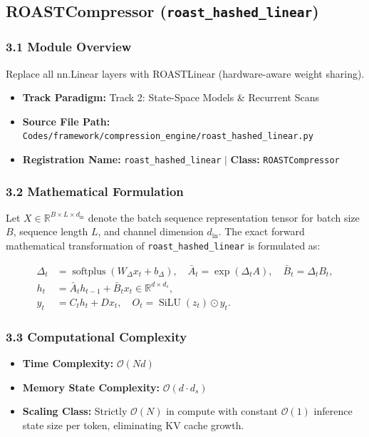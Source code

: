 \subsection{ROASTCompressor (\texttt{roast\_hashed\_linear})}
\label{sec:app_module_roast\_hashed\_linear}

\subsubsection*{3.1 Module Overview}
Replace all nn.Linear layers with ROASTLinear (hardware-aware weight sharing).
\begin{itemize}
    \item \textbf{Track Paradigm:} Track 2: State-Space Models & Recurrent Scans
    \item \textbf{Source File Path:} \texttt{Codes/framework/compression\_engine/roast\_hashed\_linear.py}
    \item \textbf{Registration Name:} \texttt{roast\_hashed\_linear} $\mid$ \textbf{Class:} \texttt{ROASTCompressor}
\end{itemize}

\subsubsection*{3.2 Mathematical Formulation}
Let $X \in \mathbb{R}^{B \times L \times d_{\text{in}}}$ denote the batch sequence representation tensor for batch size $B$, sequence length $L$, and channel dimension $d_{\text{in}}$. The exact forward mathematical transformation of \texttt{roast\_hashed\_linear} is formulated as:

\begin{align}
\Delta_t &= \operatorname{softplus}(W_\Delta x_t + b_\Delta), \quad \bar{A}_t = \exp(\Delta_t A), \quad \bar{B}_t = \Delta_t B_t, \\
h_t &= \bar{A}_t h_{t-1} + \bar{B}_t x_t \in \mathbb{R}^{d \times d_s}, \\
y_t &= C_t h_t + D x_t, \quad O_t = \operatorname{SiLU}(z_t) \odot y_t.
\end{align}


\subsubsection*{3.3 Computational Complexity}
\begin{itemize}
    \item \textbf{Time Complexity:} $\mathcal{O}(N d)$
    \item \textbf{Memory State Complexity:} $\mathcal{O}(d \cdot d_s)$
    \item \textbf{Scaling Class:} Strictly $\mathcal{O}(N)$ in compute with constant $\mathcal{O}(1)$ inference state size per token, eliminating KV cache growth.
\end{itemize}


